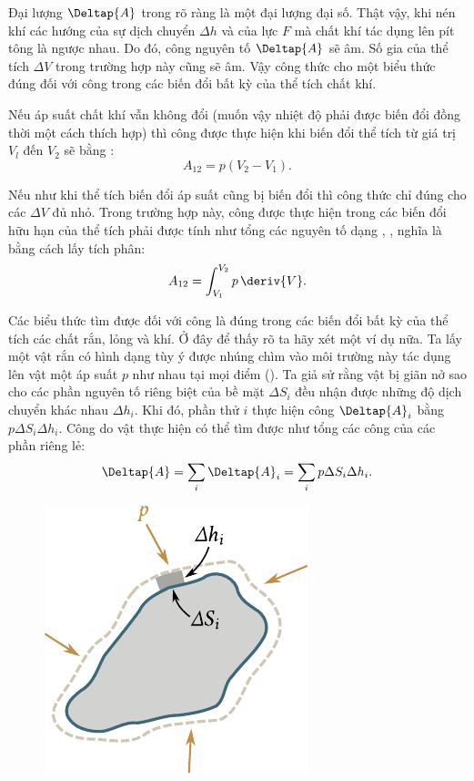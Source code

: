 Đại lượng $\Deltap{A}$ trong  rõ ràng là một đại lượng đại số. Thật vậy, khi nén khí các hướng của sự dịch chuyển $\Delta h$ và của lực $F$ mà chất khí tác dụng lên pít tông là ngược nhau. Do đó, công nguyên tố $\Deltap{A}$ sẽ âm. Số gia của thể tích $\Delta V$ trong trường hợp này cũng sẽ âm. Vậy công thức  cho một biểu thức đúng đối với công trong các biến đổi bất kỳ của thể tích chất khí.

Nếu áp suất chất khí vẫn không đổi (muốn vậy nhiệt độ phải được biến đổi đồng thời một cách thích hợp) thì công được thực hiện khi biến đổi thể tích từ giá trị $V_l$ đến $V_2$ sẽ bằng :
\begin{equation}\label{eq:10_11}
	A_{12} = p(V_2 - V_1).
\end{equation}

\noindent
Nếu như khi thể tích biến đổi áp suất cũng bị biến đổi thì công thức  chỉ đúng cho các  $\Delta V$ đủ nhỏ. Trong trường hợp này, công được thực hiện trong các biến đổi hữu hạn của thể tích phải được tính như tổng các nguyên tố dạng , \ie, nghĩa là bằng cách lấy tích phân:
\begin{equation}\label{eq:10_12}
	A_{12} = \int_{V_1}^{V_2} p\,\deriv{V}.
\end{equation}

Các biểu thức tìm được đối với công là đúng trong các biến đổi bất kỳ của thể tích các chất rắn, lỏng và khí. Ở đây để thấy rõ ta hãy xét một ví dụ nữa. Ta lấy một vật rắn có hình dạng tùy ý được nhúng chìm vào môi trường này tác dụng lên vật một áp suất $p$ như nhau tại mọi điểm (). Ta giả sử rằng vật bị giãn nở sao cho các phần nguyên tố riêng biệt của bề mặt $\Delta S_i$ đều nhận được những độ dịch chuyển khác nhau $\Delta h_i$. Khi đó, phần thử $i$ thực hiện công $\Deltap{A}_i$ bằng $p\Delta S_i\Delta h_i$. Công do vật thực hiện có thể tìm được như tổng các công của các phần riêng lẻ:
\begin{equation*}
	\Deltap{A} = \sum_i\Deltap{A}_i = \sum_i p \Delta S_i \Delta h_i.
\end{equation*}

\begin{figure}[!htb]
	\begin{center}
		\includegraphics[scale=1.0]{figures/ch_10/fig_10_3.pdf}
		\caption[]{}
		\label{fig:10_3}
	\end{center}
\end{figure}

